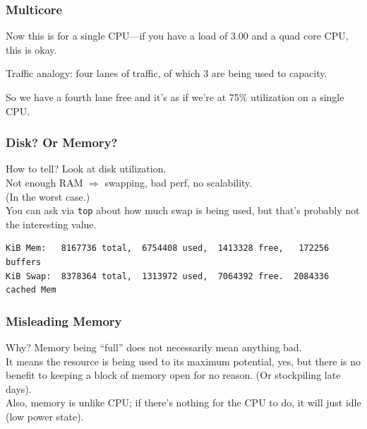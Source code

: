 \begin{frame}
\frametitle{Multicore}


\begin{changemargin}{1cm}
Now this is for a single CPU---if you have a load of 3.00 and a quad core CPU, this is okay. 

Traffic analogy: four lanes of traffic, of which 3 are being used to capacity.

So we have a fourth lane free and it's as if we're at 75\% utilization on a single CPU.
\end{changemargin}

\end{frame}


\begin{frame}[fragile]
\frametitle{Disk? Or Memory?}


\begin{changemargin}{1cm}
How to tell? Look at disk utilization. \\[1em]

Not enough RAM $\Rightarrow$ swapping, bad perf, no scalability.\\[1em]

(In the worst case.)\\[1em]

You can ask via \texttt{top} about how much swap is being used, but that's probably not the interesting value. 

{\scriptsize
\begin{verbatim}
KiB Mem:   8167736 total,  6754408 used,  1413328 free,   172256 buffers
KiB Swap:  8378364 total,  1313972 used,  7064392 free.  2084336 cached Mem
\end{verbatim}
}
\end{changemargin}

\end{frame}



\begin{frame}
\frametitle{Misleading Memory}


\begin{changemargin}{1cm}
Why? Memory being ``full'' does not necessarily mean anything bad. \\[1em]

It means the resource is being used to its maximum potential, yes, but there is no benefit to keeping a block of memory open for no reason. (Or stockpiling late days).\\[1em]

Also, memory is unlike CPU; if there's nothing for the CPU to do, it will just idle (low power state).
\end{changemargin}

\end{frame}


